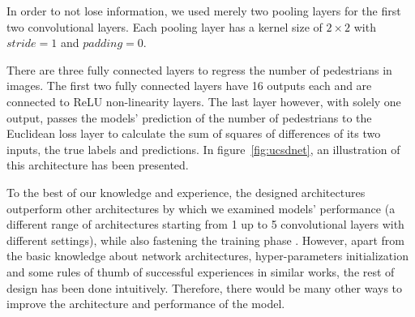 \indent In order to not lose information, we used merely two pooling layers for the first two convolutional layers. Each pooling layer has a kernel size of $2\times2$ with $stride = 1$  and $padding = 0$. 

There are three fully connected layers to regress the number of pedestrians in images. The first two fully connected layers have 16 outputs each and are connected to ReLU non-linearity layers. The last layer however, with solely one output, passes the models' prediction of the number of pedestrians to the Euclidean loss layer to calculate the sum of squares of differences of its two inputs, the true labels and predictions. In figure~\ref{fig:ucsdnet}, an illustration of this architecture has been presented.

To the best of our knowledge and experience, the designed architectures outperform other architectures by which we examined models' performance (a different range of architectures starting from 1 up to 5 convolutional layers with different settings), while also fastening the training phase . However, apart from the basic knowledge about network architectures, hyper-parameters initialization and some rules of thumb of successful experiences in similar works, the rest of design has been done intuitively. Therefore, there would be many other ways to improve the architecture and performance of the model.  

